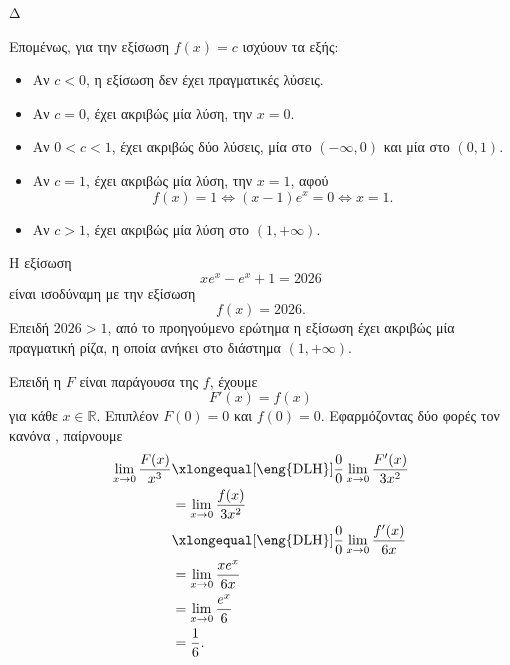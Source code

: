 \begin{thema}{Δ}
\begin{erwthma}
Επομένως, για την εξίσωση $f(x)=c$ ισχύουν τα εξής:
\begin{itemize}
\item Αν $c<0$, η εξίσωση δεν έχει πραγματικές λύσεις.
\item Αν $c=0$, έχει ακριβώς μία λύση, την $x=0$.
\item Αν $0<c<1$, έχει ακριβώς δύο λύσεις, μία στο $(-\infty,0)$ και μία στο $(0,1)$.
\item Αν $c=1$, έχει ακριβώς μία λύση, την $x=1$, αφού
\[
f(x)=1\Leftrightarrow (x-1)e^x=0\Leftrightarrow x=1.
\]
\item Αν $c>1$, έχει ακριβώς μία λύση στο $(1,+\infty)$.
\end{itemize}

\item Η εξίσωση
\[
xe^x-e^x+1=2026
\]
είναι ισοδύναμη με την εξίσωση
\[
f(x)=2026.
\]
Επειδή $2026>1$, από το προηγούμενο ερώτημα η εξίσωση έχει ακριβώς μία πραγματική ρίζα, η οποία ανήκει στο διάστημα $(1,+\infty)$.

\item Επειδή η $F$ είναι παράγουσα της $f$, έχουμε
\[
F'(x)=f(x)
\]
για κάθε $x\in\mathbb{R}$. Επιπλέον $F(0)=0$ και $f(0)=0$. Εφαρμόζοντας δύο φορές τον κανόνα , παίρνουμε
\begin{align*}
\lim_{x\to0}\frac{F(x)}{x^3}
&\xlongequal[\text{\eng{DLH}}]{\frac{0}{0}}
\lim_{x\to0}\frac{F'(x)}{3x^2}\\
&=\lim_{x\to0}\frac{f(x)}{3x^2}\\
&\xlongequal[\text{\eng{DLH}}]{\frac{0}{0}}
\lim_{x\to0}\frac{f'(x)}{6x}\\
&=\lim_{x\to0}\frac{xe^x}{6x}\\
&=\lim_{x\to0}\frac{e^x}{6}\\
&={\frac{1}{6}}.
\end{align*}
\end{erwthma}
\end{thema}
